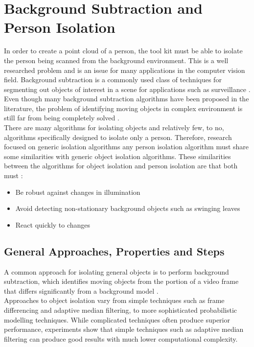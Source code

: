 \section{Background Subtraction and Person Isolation}
\label{background subtraction and person isolation}
In order to create a point cloud of a person, the tool kit must be able to isolate the person being scanned from the background environment. This is a well researched problem and is an issue for many applications in the computer vision field. Background subtraction is a commonly used class of techniques for segmenting out objects of interest in a scene for applications such as surveillance \cite{McIvor2000}. Even though many background subtraction algorithms have been proposed in the literature, the problem of identifying moving objects in complex environment is still far from being completely solved \cite{Cheung2007}.\\

There are many algorithms for isolating objects and relatively few, to no, algorithms specifically designed to isolate only a person. Therefore, research focused on generic isolation algorithms any person isolation algorithm must share some similarities with generic object isolation algorithms. These similarities between the algorithms for object isolation and person isolation are that both must \cite{Cheung2007}:\begin{itemize}
  \item Be robust against changes in illumination
  \item Avoid detecting non-stationary background objects such as swinging leaves
  \item React quickly to changes
\end{itemize}

\subsection{General Approaches, Properties and Steps}
A common approach for isolating general objects is to perform background subtraction, which identifies moving objects from the portion of a video frame that differs significantly from a background model \cite{Cheung2007}.\\

Approaches to object isolation vary from simple techniques such as frame differencing and adaptive median filtering, to more sophisticated probabilistic modelling techniques. 
While complicated techniques often produce superior performance, experiments \cite{Cheung2007} show that simple techniques such as adaptive median filtering can produce good results with much lower computational complexity.\\


